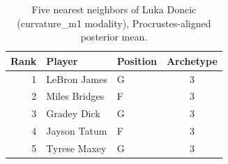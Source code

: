 \begin{table}[htbp]
  \centering\small
  \begin{tabular}{rllc}
    \toprule
    Rank & Player & Position & Archetype \\
    \midrule
    1 & LeBron James & G & 3 \\
    2 & Miles Bridges & F & 3 \\
    3 & Gradey Dick & G & 3 \\
    4 & Jayson Tatum & F & 3 \\
    5 & Tyrese Maxey & G & 3 \\
    \bottomrule
  \end{tabular}
  \caption{Five nearest neighbors of Luka Doncic (curvature_m1 modality), Procrustes-aligned posterior mean.}
  \label{tab:Luka_Doncic_neighbors_curvature_m1}
\end{table}

